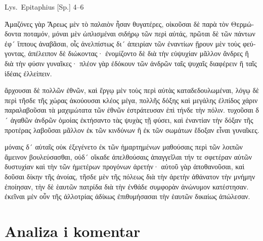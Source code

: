 Lys.\ Epitaphius [Sp.] 4–6


\medskip


{\large

\begin{greek}

\noindent Ἀμαζόνες γὰρ Ἄρεως μὲν τὸ παλαιὸν ἦσαν θυγατέρες, οἰκοῦσαι δὲ παρὰ τὸν Θερμώδοντα ποταμόν, μόναι μὲν ὡπλισμέναι σιδήρῳ τῶν περὶ αὐτάς, πρῶται δὲ τῶν πάντων ἐφ´ ἵππους ἀναβᾶσαι, οἷς ἀνελπίστως δι´ ἀπειρίαν τῶν ἐναντίων ᾕρουν μὲν τοὺς φεύγοντας, ἀπέλειπον δὲ διώκοντας· ἐνομίζοντο δὲ διὰ τὴν εὐψυχίαν μᾶλλον ἄνδρες ἢ διὰ τὴν φύσιν γυναῖκες· πλέον γὰρ ἐδόκουν τῶν ἀνδρῶν ταῖς ψυχαῖς διαφέρειν ἢ ταῖς ἰδέαις ἐλλείπειν.

ἄρχουσαι δὲ πολλῶν ἐθνῶν, καὶ ἔργῳ μὲν τοὺς περὶ αὐτὰς καταδεδουλωμέναι, λόγῳ δὲ περὶ τῆσδε τῆς χώρας ἀκούουσαι κλέος μέγα, πολλῆς δόξης καὶ μεγάλης ἐλπίδος χάριν παραλαβοῦσαι τὰ μαχιμώτατα τῶν ἐθνῶν ἐστράτευσαν ἐπὶ τήνδε τὴν πόλιν. τυχοῦσαι δ´ ἀγαθῶν ἀνδρῶν ὁμοίας ἐκτήσαντο τὰς ψυχὰς τῇ φύσει, καὶ ἐναντίαν τὴν δόξαν τῆς προτέρας λαβοῦσαι μᾶλλον ἐκ τῶν κινδύνων ἢ ἐκ τῶν σωμάτων ἔδοξαν εἶναι γυναῖκες.

μόναις δ´ αὐταῖς οὐκ ἐξεγένετο ἐκ τῶν ἡμαρτημένων μαθούσαις περὶ τῶν λοιπῶν ἄμεινον βουλεύσασθαι, οὐδ´ οἴκαδε ἀπελθούσαις ἀπαγγεῖλαι τήν τε σφετέραν αὐτῶν δυστυχίαν καὶ τὴν τῶν ἡμετέρων προγόνων ἀρετήν· αὐτοῦ γὰρ ἀποθανοῦσαι, καὶ δοῦσαι δίκην τῆς ἀνοίας, τῆσδε μὲν τῆς πόλεως διὰ τὴν ἀρετὴν ἀθάνατον τὴν μνήμην ἐποίησαν, τὴν δὲ ἑαυτῶν πατρίδα διὰ τὴν ἐνθάδε συμφορὰν ἀνώνυμον κατέστησαν. ἐκεῖναι μὲν οὖν τῆς ἀλλοτρίας ἀδίκως ἐπιθυμήσασαι τὴν ἑαυτῶν δικαίως ἀπώλεσαν.

\end{greek}

}

\newpage

\section*{Analiza i komentar}


